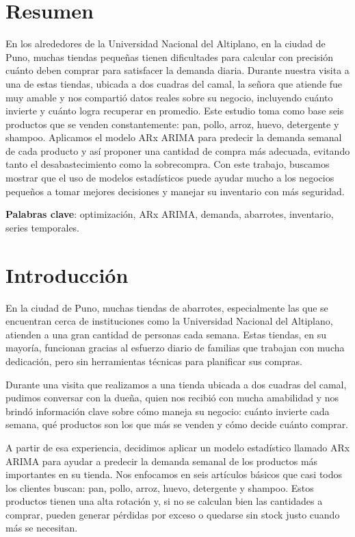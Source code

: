 \documentclass[12pt]{article}
\begin{document}
\section*{Resumen}
\justifying
En los alrededores de la Universidad Nacional del Altiplano, en la ciudad de Puno, muchas tiendas pequeñas tienen dificultades para calcular con precisión cuánto deben comprar para satisfacer la demanda diaria. Durante nuestra visita a una de estas tiendas, ubicada a dos cuadras del camal, la señora que atiende fue muy amable y nos compartió datos reales sobre su negocio, incluyendo cuánto invierte y cuánto logra recuperar en promedio. Este estudio toma como base seis productos que se venden constantemente: pan, pollo, arroz, huevo, detergente y shampoo. Aplicamos el modelo ARx ARIMA para predecir la demanda semanal de cada producto y así proponer una cantidad de compra más adecuada, evitando tanto el desabastecimiento como la sobrecompra. Con este trabajo, buscamos mostrar que el uso de modelos estadísticos puede ayudar mucho a los negocios pequeños a tomar mejores decisiones y manejar su inventario con más seguridad.

\textbf{Palabras clave}: optimización, ARx ARIMA, demanda, abarrotes, inventario, series temporales.

\vspace{0.5cm}

\section{Introducción}
\justifying
En la ciudad de Puno, muchas tiendas de abarrotes, especialmente las que se encuentran cerca de instituciones como la Universidad Nacional del Altiplano, atienden a una gran cantidad de personas cada semana. Estas tiendas, en su mayoría, funcionan gracias al esfuerzo diario de familias que trabajan con mucha dedicación, pero sin herramientas técnicas para planificar sus compras.

Durante una visita que realizamos a una tienda ubicada a dos cuadras del camal, pudimos conversar con la dueña, quien nos recibió con mucha amabilidad y nos brindó información clave sobre cómo maneja su negocio: cuánto invierte cada semana, qué productos son los que más se venden y cómo decide cuánto comprar.

A partir de esa experiencia, decidimos aplicar un modelo estadístico llamado ARx ARIMA para ayudar a predecir la demanda semanal de los productos más importantes en su tienda. Nos enfocamos en seis artículos básicos que casi todos los clientes buscan: pan, pollo, arroz, huevo, detergente y shampoo. Estos productos tienen una alta rotación y, si no se calculan bien las cantidades a comprar, pueden generar pérdidas por exceso o quedarse sin stock justo cuando más se necesitan.
\end{document}
